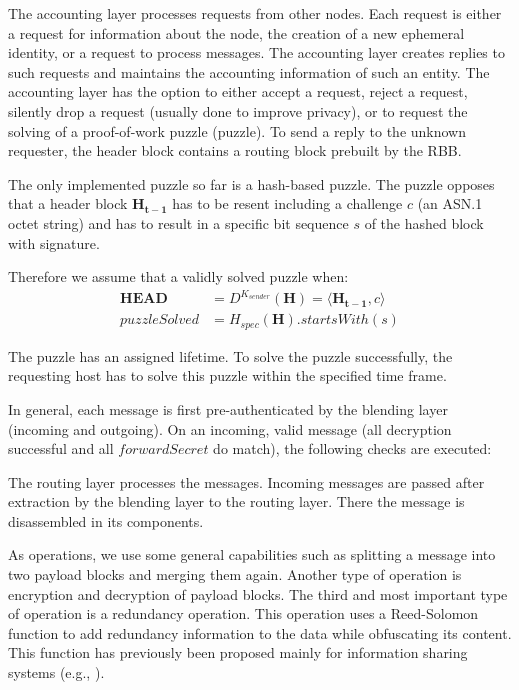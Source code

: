 \documentclass[acmsmall, screen, review]{acmart}
\begin{document}
	The accounting layer processes requests from other nodes. Each request is either a request for information about the node, the creation of a new ephemeral identity, or a request to process messages. The accounting layer creates replies to such requests and maintains the accounting information of such an entity. The accounting layer has the option to either accept a request, reject a request, silently drop a request (usually done to improve privacy), or to request the solving of a proof-of-work puzzle (puzzle). To send a reply to the unknown requester, the header block contains a routing block prebuilt by the RBB.
	
	The only implemented puzzle so far is a hash-based puzzle. The puzzle opposes that a header block $\mathbf{H_{t-1}}$ has to be resent including a challenge $c$ (an ASN.1 octet string) and has to result in a specific bit sequence $s$ of the hashed block with signature.
	
	Therefore we assume that a validly solved puzzle when:
	\begin{eqnarray}
	\mathbf{HEAD}&= D^{K_{sender}}\left(\mathbf{H}\right) = \langle \mathbf{H_{t-1}}, c\rangle\\
	puzzleSolved&= H_{spec}(\mathbf{H}).startsWith(s)
	\end{eqnarray}
	
	The puzzle has an assigned lifetime. To solve the puzzle successfully, the requesting host has to solve this puzzle within the specified time frame. 
	
	In general, each message is first pre-authenticated by the blending layer (incoming and outgoing). On an incoming, valid message (all decryption successful and all $forwardSecret$ do match), the following checks are executed:
	
	The routing layer processes the messages. Incoming messages are passed after extraction by the blending layer to the routing layer. There the message is disassembled in its components.
	
	As operations, we use some general capabilities such as splitting a message into two payload blocks and merging them again. Another type of operation is encryption and decryption of payload blocks. The third and most important type of operation is a redundancy operation. This operation uses a Reed-Solomon\cite{reed1960polynomial} function to add redundancy information to the data while obfuscating its content. This function has previously been proposed mainly for information sharing systems (e.g., \cite{mceliece1981sharing}).
	
\end{document}
